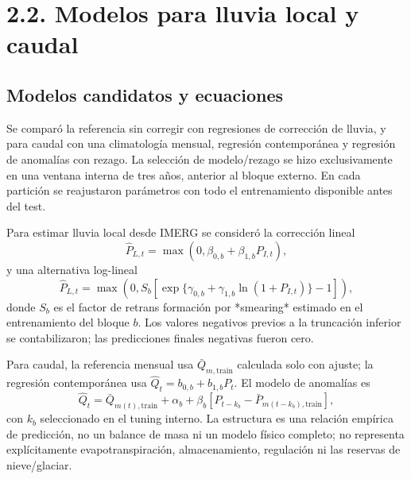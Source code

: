 \documentclass[12pt,letterpaper]{article}
\begin{document}
\section{2.2. Modelos para lluvia local y caudal}

\subsection{Modelos candidatos y ecuaciones}
Se comparó la referencia sin corregir con regresiones de corrección de lluvia, y para caudal con una climatología mensual, regresión contemporánea y regresión de anomalías con rezago. La selección de modelo/rezago se hizo exclusivamente en una ventana interna de tres años, anterior al bloque externo. En cada partición se reajustaron parámetros con todo el entrenamiento disponible antes del test.

Para estimar lluvia local desde IMERG se consideró la corrección lineal
\begin{equation}
\widehat{P}_{L,t}=\max(0,\beta_{0,b}+\beta_{1,b}P_{I,t}),
\label{eq:rain-linear}
\end{equation}
y una alternativa log-lineal
\begin{equation}
\widehat{P}_{L,t}=\max\!\left(0,S_b\left[\exp\{\gamma_{0,b}+\gamma_{1,b}\ln(1+P_{I,t})\}-1\right]\right),
\label{eq:rain-log}
\end{equation}
donde $S_b$ es el factor de retrans formación por *smearing* estimado en el entrenamiento del bloque $b$. Los valores negativos previos a la truncación inferior se contabilizaron; las predicciones finales negativas fueron cero.

Para caudal, la referencia mensual usa $\bar Q_{m,\mathrm{train}}$ calculada solo con ajuste; la regresión contemporánea usa $\hat Q_t=b_{0,b}+b_{1,b}P_t$. El modelo de anomalías es
\begin{equation}
\widehat{Q}_t=\bar Q_{m(t),\mathrm{train}}+\alpha_b+\beta_b\left[P_{t-k_b}-\bar P_{m(t-k_b),\mathrm{train}}\right],
\label{eq:flow-anomaly}
\end{equation}
con $k_b$ seleccionado en el tuning interno. La estructura es una relación empírica de predicción, no un balance de masa ni un modelo físico completo; no representa explícitamente evapotranspiración, almacenamiento, regulación ni las reservas de nieve/glaciar.
\end{document}
